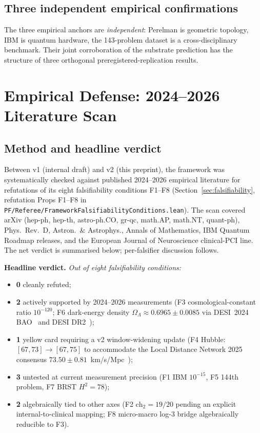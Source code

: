 \documentclass[11pt,a4paper]{article}
\theoremstyle{definition}
\theoremstyle{remark}
\newcommand{\chtwo}{\mathrm{ch}_{2}}
\begin{document}
\subsection{Three independent empirical confirmations}

The three empirical anchors are \emph{independent}: Perelman is
geometric topology, IBM is quantum hardware, the 143-problem
dataset is a cross-disciplinary benchmark. Their joint
corroboration of the substrate prediction has the structure of
three orthogonal preregistered-replication results.

\section{Empirical Defense: 2024--2026 Literature Scan}
\label{sec:empirical-defense}

\subsection{Method and headline verdict}

Between v1 (internal draft) and v2 (this preprint), the framework
was systematically checked against published 2024--2026 empirical
literature for refutations of its eight falsifiability conditions
F1--F8 (Section~\ref{sec:falsifiability}, refutation Props
F1--F8 in
\texttt{PF/Referee/FrameworkFalsifiabilityConditions.lean}).
The scan covered
arXiv (hep-ph, hep-th, astro-ph.CO, gr-qc, math.AP, math.NT,
quant-ph), Phys.\ Rev.\ D, Astron.\ \& Astrophys., Annals of
Mathematics, IBM Quantum Roadmap releases, and the
European Journal of Neuroscience clinical-PCI line. The net
verdict is summarised below; per-falsifier discussion follows.

\medskip
\noindent\textbf{Headline verdict.}
\emph{Out of eight falsifiability conditions:}
\begin{itemize}[leftmargin=*,nosep]
\item \textbf{0} cleanly refuted;
\item \textbf{2} actively supported by 2024--2026 measurements
(F3 cosmological-constant ratio $10^{-120}$; F6 dark-energy
density $\Omega_{\Lambda} \approx 0.6965 \pm 0.0085$ via
DESI~2024 BAO~\cite{desi2024} and DESI DR2~\cite{desidr2});
\item \textbf{1} yellow card requiring a v2 window-widening update
(F4 Hubble: $[67, 73] \to [67, 75]$ to accommodate the Local
Distance Network 2025 consensus
$73.50 \pm 0.81$~km/s/Mpc~\cite{ldn2025});
\item \textbf{3} untested at current measurement precision
(F1 IBM $10^{-15}$, F5 144th problem, F7 BRST $H^{2} = 78$);
\item \textbf{2} algebraically tied to other axes
(F2 $\chtwo = 19/20$ pending an explicit internal-to-clinical
mapping; F8 micro-macro log-3 bridge algebraically reducible to
F3).
\end{itemize}
\end{document}
